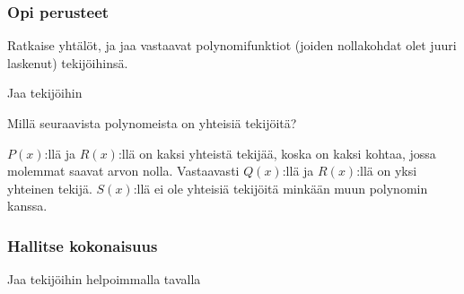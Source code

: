\begin{tehtavasivu}

\subsubsection*{Opi perusteet}

\begin{tehtava}
	Ratkaise yhtälöt, ja jaa vastaavat polynomifunktiot (joiden nollakohdat olet juuri laskenut) tekijöihinsä.
	\begin{vastaus}
	\end{vastaus}
\end{tehtava}

\begin{tehtava}
Jaa tekijöihin
\begin{vastaus}
\end{vastaus}
\end{tehtava}

\begin{tehtava}
    Millä seuraavista polynomeista on yhteisiä tekijöitä?

    \begin{kuvaajapohja}{1.5}{-1.5}{2.5}{-3.5}{1.5}
    \end{kuvaajapohja}
    \begin{vastaus}
	$P(x)$:llä ja $R(x)$:llä on kaksi yhteistä tekijää, koska on kaksi kohtaa, jossa molemmat saavat arvon nolla. Vastaavasti $Q(x)$:llä ja $R(x)$:llä on yksi yhteinen tekijä. $S(x)$:llä ei ole yhteisiä tekijöitä minkään muun polynomin kanssa.
    \end{vastaus}
\end{tehtava}

\subsubsection*{Hallitse kokonaisuus}

\begin{tehtava}
    Jaa tekijöihin helpoimmalla tavalla
    \begin{vastaus}
    \end{vastaus}
\end{tehtava}


\end{tehtavasivu}
